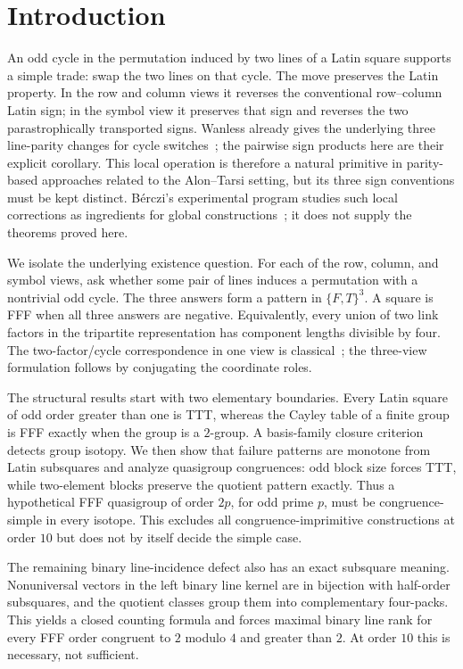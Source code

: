 \section{Introduction}

An odd cycle in the permutation induced by two lines of a Latin square
supports a simple trade: swap the two lines on that cycle.  The move preserves
the Latin property.  In the row and column views it reverses the conventional
row--column Latin sign; in the symbol view it preserves that sign and reverses
the two parastrophically transported signs. Wanless already gives the
underlying three line-parity changes for cycle
switches~\cite[Proposition~1]{Wanless2004CycleSwitches}; the pairwise sign
products here are their explicit corollary. This local operation is therefore
a natural primitive in parity-based approaches related to the Alon--Tarsi
setting, but its three sign conventions must be kept distinct.  B\'erczi's
experimental program studies such local corrections as ingredients for
global constructions~\cite{Berczi2026}; it does not supply the theorems proved
here.

We isolate the underlying existence question.  For each of the row, column,
and symbol views, ask whether some pair of lines induces a permutation with a
nontrivial odd cycle.  The three answers form a pattern in $\{F,T\}^3$.  A
square is FFF when all three answers are negative.  Equivalently, every union
of two link factors in the tripartite representation has component lengths
divisible by four. The two-factor/cycle correspondence in one view is
classical~\cite[Section~3]{WanlessIhrig2005Factorizations}; the three-view
formulation follows by conjugating the coordinate roles.

The structural results start with two elementary boundaries.  Every
Latin square of odd order greater than one is TTT, whereas the Cayley table of a finite group
is FFF exactly when the group is a
$2$-group.  A basis-family closure criterion detects group isotopy.  We then
show that failure patterns are monotone from Latin subsquares and analyze
quasigroup congruences: odd block size forces TTT, while two-element blocks
preserve the quotient pattern exactly.  Thus a hypothetical FFF quasigroup of
order $2p$, for odd prime $p$, must be congruence-simple in every isotope.
This excludes all congruence-imprimitive constructions at order $10$ but does
not by itself decide the simple case.

The remaining binary line-incidence defect also has an exact subsquare
meaning.  Nonuniversal vectors in the left binary line kernel are in
bijection with half-order subsquares, and the quotient classes group them
into complementary four-packs.  This yields a closed counting formula and
forces maximal binary line rank for every FFF order congruent to $2$ modulo
$4$ and greater than $2$.  At order $10$ this is necessary, not sufficient.

